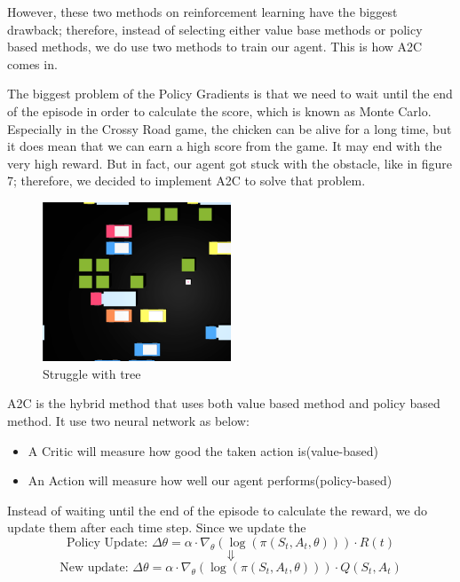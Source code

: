 \documentclass{article}
\begin{document}
However, these two methods on reinforcement learning have the biggest drawback; therefore, instead of selecting either value base methods or policy based methods, we do use two methods to train our agent. This is how A2C comes in. \par 

The biggest problem of the Policy Gradients is that we need to wait until the end of the episode in order to calculate the score, which is known as Monte Carlo. Especially in the Crossy Road game, the chicken can be alive for a long time, but it does mean that we can earn a high score from the game.
It may end with the very high reward. But in fact, our agent got stuck with the obstacle, like in figure 7; therefore, we decided to implement A2C to solve that problem. \par

\begin{figure}[h]
    \caption{Struggle with tree}
    \centering
    \includegraphics[width=0.5\textwidth]{obstacles_trapped.png}
\end{figure}

A2C is the hybrid method that uses both value based method and policy based method. It use two neural network as below:
\begin{itemize}
\item A Critic will measure how good the taken action is(value-based)
\item An Action will measure how well our agent performs(policy-based)
\end{itemize}

Instead of waiting until the end of the episode to calculate the reward, we do update them after each time step. Since we update the 
$$\text{Policy Update: } \Delta \theta = \alpha \cdot \nabla_{\theta} (\log(\pi (S_t, A_t, \theta))) \cdot R(t)$$
$$\Downarrow$$
$$\text{New update: } \Delta \theta = \alpha \cdot \nabla_{\theta} (\log(\pi (S_t, A_t, \theta))) \cdot Q(S_t, A_t)$$
\end{document}
